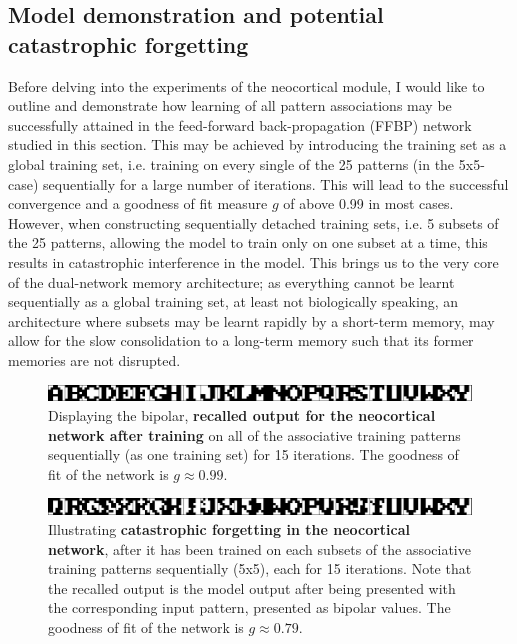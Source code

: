 \subsection{Model demonstration and potential catastrophic forgetting}

Before delving into the experiments of the neocortical module, I would like to outline and demonstrate how learning of all pattern associations may be successfully attained in the feed-forward back-propagation (FFBP) network studied in this section. This may be achieved by introducing the training set as a global training set, i.e. training on every single of the 25 patterns (in the 5x5-case) sequentially for a large number of iterations. This will lead to the successful convergence and a goodness of fit measure $g$ of above 0.99 in most cases. However, when constructing sequentially detached training sets, i.e. 5 subsets of the 25 patterns, allowing the model to train only on one subset at a time, this results in catastrophic interference in the model. This brings us to the very core of the dual-network memory architecture; as everything cannot be learnt sequentially as a global training set, at least not biologically speaking, an architecture where subsets may be learnt rapidly by a short-term memory, may allow for the slow consolidation to a long-term memory such that its former memories are not disrupted.

\begin{figure}
    \centering
    \includegraphics[width=13cm]{fig/neo-intro-demo/global_aggregate_im}
    \caption{Displaying the bipolar, \textbf{recalled output for the neocortical network after training} on all of the associative training patterns sequentially (as one training set) for 15 iterations. The goodness of fit of the network is $g\approx0.99$.}
    \label{fig:global_aggregate_im}
\end{figure}

\begin{figure}
    \centering
    \includegraphics[width=13cm]{fig/neo-intro-demo/local_aggregate_im}
    \caption{Illustrating \textbf{catastrophic forgetting in the neocortical network}, after it has been trained on each subsets of the associative training patterns sequentially (5x5), each for 15 iterations. Note that the recalled output is the model output after being presented with the corresponding input pattern, presented as bipolar values. The goodness of fit of the network is $g\approx0.79$.}
    \label{fig:local_aggregate_im}
\end{figure}

